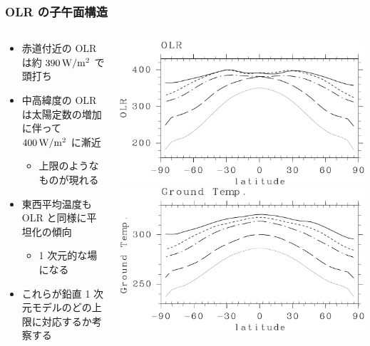 \documentclass[aspectratio=149,9pt,fleqn]{beamer}
\begin{document}
\begin{frame}
	\frametitle{OLR の子午面構造}
	\begin{columns}[T,onlytextwidth]
		\begin{column}{.55\textwidth}
			\begin{itemize}
				\item 赤道付近の OLR は約 \(390\hmu{W/m^2}\) で頭打ち
				\item 中高緯度の OLR は太陽定数の増加に伴って \(400\hmu{W/m^2}\) に漸近
					\begin{itemize}
						\item 上限のようなものが現れる
					\end{itemize}
				\item 東西平均温度も OLR と同様に平坦化の傾向
					\begin{itemize}
						\item 1 次元的な場になる
					\end{itemize}
				\item これらが鉛直 1 次元モデルのどの上限に対応するか考察する
			\end{itemize}
		\end{column}
		\begin{column}{.4\textwidth}
			\centering
			\includegraphics[width=\textwidth]{./fig/OLR-meris.kps-crop.pdf}\\
			\includegraphics[width=\textwidth]{./fig/Tg-meris.kps-crop.pdf}\\

\end{column}
\end{columns}
\end{frame}
\end{document}
